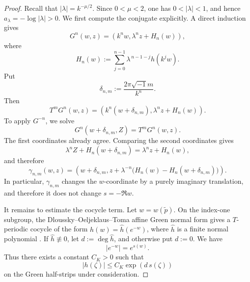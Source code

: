 \documentclass[12pt]{amsart}
\numberwithin{equation}{section}
\theoremstyle{remark}
\theoremstyle{definition}
\begin{document}
\begin{proof}
Recall that $|\lambda|=k^{-\mu/2}$. Since $0<\mu<2$, one has $0<|\lambda|<1$, and hence $a_\lambda=-\log|\lambda|>0$. 
We first compute the conjugate explicitly. A direct induction gives
\begin{equation*}
G^n(w,z)
=
\left(
k^nw,\lambda^nz+H_n(w)
\right),
\end{equation*}
where
\begin{equation*}
H_n(w):=
\sum_{j=0}^{n-1}
\lambda^{\,n-1-j}h(k^jw).
\end{equation*}
Put
\begin{equation*}
\delta_{n,m}:=\frac{2\pi\sqrt{-1}m}{k^n}.
\end{equation*}
Then
$$
T^mG^n(w,z)=\left(k^n(w+\delta_{n,m}),\lambda^nz+H_n(w)\right).
$$
To apply $G^{-n}$, we solve
$$
G^n(w+\delta_{n,m},Z)=T^mG^n(w,z).
$$
The first coordinates already agree. Comparing the second coordinates gives
\begin{equation*}
\lambda^nZ+H_n(w+\delta_{n,m})
=
\lambda^nz+H_n(w),
\end{equation*}
and therefore
\begin{equation}
\label{eq:green-conjugate-formula}
\gamma_{n,m}(w,z)
=
\left(
w+\delta_{n,m},
z+\lambda^{-n}
\bigl(H_n(w)-H_n(w+\delta_{n,m})\bigr)
\right).
\end{equation}
In particular, $\gamma_{n,m}$ changes the $w$-coordinate by a purely
imaginary translation, and therefore it does not change $s=-\Re w$.

It remains to estimate the cocycle term. Let $w=w(\tilde p)$. On the index-one subgroup, the Dloussky--Oeljeklaus--Toma affine Green normal form gives a $T$-periodic cocycle of the form $h(w)=\widehat h(e^{-w})$, where $\widehat h$ is a finite normal polynomial \cite{dloussky-oeljeklaus-toma,oeljeklaus-toma-moduli}. If
$\widehat h\not\equiv0$, let $d:=\deg\widehat h$, and otherwise put
$d:=0$.
We have
$$
|e^{-w}|=e^{s(w)}.
$$
Thus there exists a constant $C_K>0$ such that
\begin{equation}
\label{eq:h-polynomial-growth}
|h(\zeta)|
\leq
C_K\exp(d\,s(\zeta))
\end{equation}
on the Green half-strips under consideration.


\end{proof}
\end{document}
